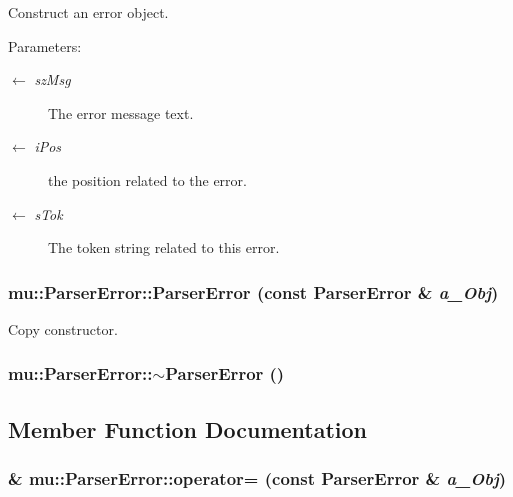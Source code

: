 Construct an error object. 

\begin{Desc}
\item[Parameters:]
\begin{description}
\item[\mbox{$\leftarrow$} {\em szMsg}]The error message text. \item[\mbox{$\leftarrow$} {\em iPos}]the position related to the error. \item[\mbox{$\leftarrow$} {\em sTok}]The token string related to this error. \end{description}
\end{Desc}
\subsubsection[ParserError]{\setlength{\rightskip}{0pt plus 5cm}mu::ParserError::ParserError (const {\bf ParserError} \& {\em a\_\-Obj})}\label{classmu_1_1ParserError_0820d687ae9ed8eed5bad962b40d006c}


Copy constructor. 

\subsubsection[$\sim$ParserError]{\setlength{\rightskip}{0pt plus 5cm}mu::ParserError::$\sim$ParserError ()}\label{classmu_1_1ParserError_ee52babeeffcf663365b551c3ea61e1f}




\subsection{Member Function Documentation}
\subsubsection[operator=]{ \& mu::ParserError::operator= (const {\bf ParserError} \& {\em a\_\-Obj})}\label{classmu_1_1ParserError_e2c28377fa08e425a5f3df2cfa221b33}


